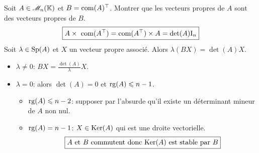 Soit $A \in \mathscr{M}_n(\mathbb{K})$ et $B = \mathrm{com}(A)^\top$. Montrer que les vecteurs propres de $A$ sont des vecteurs propres de $B$. 
$$\boxed{A \times\ \mathrm{com}(A^\top) = \mathrm{com}(A^\top) \times A = \det(A) \mathrm{I}_n}$$
Soit $\lambda \in \mathrm{Sp}(A)$ et $X$ un vecteur propre associé. Alors $\lambda (BX) = \det(A) X$. 

\begin{itemize}
    \item $\lambda \not = 0$: $BX = \frac{\det(A)}{\lambda}X$. 
    \item $\lambda = 0$: alors $\det(A) = 0$ et $\mathrm{rg}(A) \leqslant n-1$. 
    \begin{itemize}
        \item $\mathrm{rg}(A) \leqslant n-2$: supposer par l'absurde qu'il existe un déterminant mineur de $A$ non nul. 
        \item $\mathrm{rg}(A) = n-1$: $X \in \mathrm{Ker}(A)$ qui est une droite vectorielle. 
        $$\boxed{A \text{ et } B \text{ commutent donc } \mathrm{Ker}(A) \text{ est stable par } B}$$
    \end{itemize}
\end{itemize}